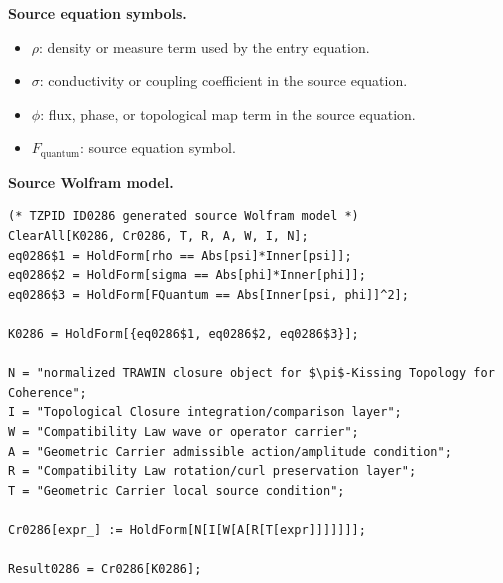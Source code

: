 \begin{minipage}[t]{0.49\linewidth}
\begingroup
\small
\raggedright
\textbf{Source equation symbols.}\par
\begin{itemize}[leftmargin=1.35em,itemsep=1pt,topsep=1pt,parsep=0pt]
    \item $\rho$: density or measure term used by the entry equation.
    \item $\sigma$: conductivity or coupling coefficient in the source equation.
    \item $\phi$: flux, phase, or topological map term in the source equation.
    \item $F_{\mathrm{quantum}}$: source equation symbol.
\end{itemize}
\endgroup
\end{minipage}\hfill
\begin{minipage}[t]{0.47\linewidth}
\begingroup
\scriptsize
\raggedright
\textbf{Source Wolfram model.}\par
\begin{Verbatim}[fontsize=\tiny,breaklines=true,breakanywhere=true]
(* TZPID ID0286 generated source Wolfram model *)
ClearAll[K0286, Cr0286, T, R, A, W, I, N];
eq0286$1 = HoldForm[rho == Abs[psi]*Inner[psi]];
eq0286$2 = HoldForm[sigma == Abs[phi]*Inner[phi]];
eq0286$3 = HoldForm[FQuantum == Abs[Inner[psi, phi]]^2];

K0286 = HoldForm[{eq0286$1, eq0286$2, eq0286$3}];

N = "normalized TRAWIN closure object for $\pi$-Kissing Topology for Coherence";
I = "Topological Closure integration/comparison layer";
W = "Compatibility Law wave or operator carrier";
A = "Geometric Carrier admissible action/amplitude condition";
R = "Compatibility Law rotation/curl preservation layer";
T = "Geometric Carrier local source condition";

Cr0286[expr_] := HoldForm[N[I[W[A[R[T[expr]]]]]]];

Result0286 = Cr0286[K0286];
\end{Verbatim}
\endgroup
\end{minipage}

